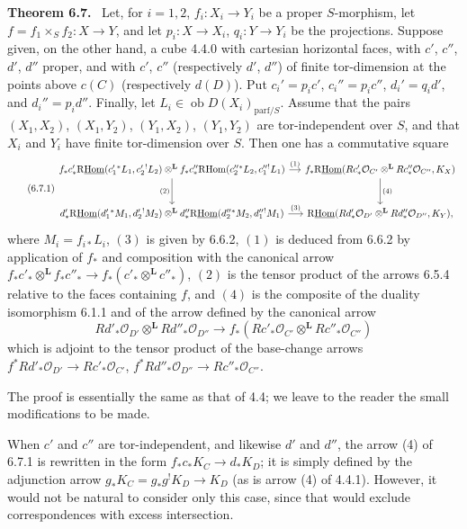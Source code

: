\documentclass[11pt]{article}
\providecommand{\cO}{\mathcal{O}}
\newenvironment{statement}[1]{\par\medskip\noindent\textbf{#1.}\ }{\par\medskip}
\begin{document}
\begin{statement}{Theorem 6.7}
Let, for $i=1,2$, $f_i:X_i\to Y_i$ be a proper $S$-morphism, let $f=f_1\times_Sf_2:X\to Y$, and let $p_i:X\to X_i$, $q_i:Y\to Y_i$ be the projections. Suppose given, on the other hand, a cube 4.4.0 with cartesian horizontal faces, with $c'$, $c''$, $d'$, $d''$ proper, and with $c'$, $c''$ (respectively $d'$, $d''$) of finite tor-dimension at the points above $c(C)$ (respectively $d(D)$). Put $c_i'=p_ic'$, $c_i''=p_ic''$, $d_i'=q_id'$, and $d_i''=p_id''$. Finally, let $L_i\in\operatorname{ob}D(X_i)_{\mathrm{parf}/S}$. Assume that the pairs $(X_1,X_2)$, $(X_1,Y_2)$, $(Y_1,X_2)$, $(Y_1,Y_2)$ are tor-independent over $S$, and that $X_i$ and $Y_i$ have finite tor-dimension over $S$. Then one has a commutative square
\begin{equation}
\tag{6.7.1}
\begin{tikzcd}[column sep=small,row sep=large]
f_*c'_*\mathrm{R}\underline{\mathrm{Hom}}(c_1'{}^*L_1,c_2'{}^!L_2)\otimes^{\mathbf L} f_*c''_*\mathrm{R}\mathrm{Hom}(c_2''{}^*L_2,c_1''{}^!L_1) \arrow[r,"(1)"] \arrow[d,"(2)"']
& f_*\mathrm{R}\underline{\mathrm{Hom}}(Rc'_*\cO_{C'}\otimes^{\mathbf L}Rc''_*\cO_{C''},K_X) \arrow[d,"(4)"] \\
d'_*\mathrm{R}\underline{\mathrm{Hom}}(d_1'{}^*M_1,d_2'{}^!M_2)\otimes^{\mathbf L} d''_*\mathrm{R}\underline{\mathrm{Hom}}(d_2''{}^*M_2,d_1''{}^!M_1) \arrow[r,"(3)"]
& \mathrm{R}\underline{\mathrm{Hom}}(Rd'_*\cO_{D'}\otimes^{\mathbf L}Rd''_*\cO_{D''},K_Y),
\end{tikzcd}
\end{equation}
where $M_i=f_{i*}L_i$, $(3)$ is given by 6.6.2, $(1)$ is deduced from 6.6.2 by application of $f_*$ and composition with the canonical arrow $f_*c'_*\otimes^{\mathbf L} f_*c''_*\to f_*(c'_*\otimes^{\mathbf L} c''_*)$, $(2)$ is the tensor product of the arrows 6.5.4 relative to the faces containing $f$, and $(4)$ is the composite of the duality isomorphism 6.1.1 and of the arrow defined by the canonical arrow
\[
Rd'_*\cO_{D'}\otimes^{\mathbf L}Rd''_*\cO_{D''}\longrightarrow f_*(Rc'_*\cO_{C'}\otimes^{\mathbf L}Rc''_*\cO_{C''})
\]
which is adjoint to the tensor product of the base-change arrows $f^*Rd'_*\cO_{D'}\to Rc'_*\cO_{C'}$, $f^*Rd''_*\cO_{D''}\to Rc''_*\cO_{C''}$.
\end{statement}

The proof is essentially the same as that of 4.4; we leave to the reader the small modifications to be made.

When $c'$ and $c''$ are tor-independent, and likewise $d'$ and $d''$, the arrow (4) of 6.7.1 is rewritten in the form $f_*c_*K_C\to d_*K_D$; it is simply defined by the adjunction arrow $g_*K_C=g_*g^!K_D\to K_D$ (as is arrow (4) of 4.4.1). However, it would not be natural to consider only this case, since that would exclude correspondences with excess intersection.
\end{document}

